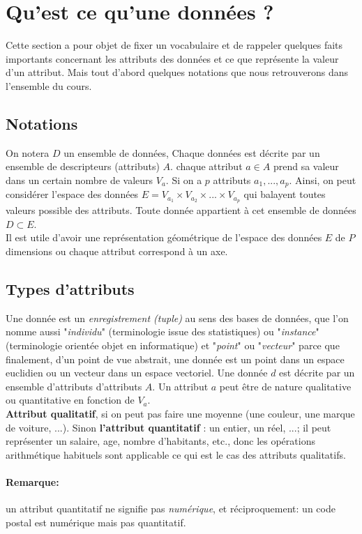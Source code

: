 \documentclass[runningheads,a4paper]{llncs}
\begin{document}
\section{Qu’est ce qu’une données ?}
Cette section a pour objet de fixer un vocabulaire et de rappeler quelques faits importants concernant les attributs des données et ce que représente la valeur d’un attribut. Mais tout d’abord quelques notations que nous retrouverons dans l’ensemble du cours. 
\subsection{Notations}
On notera $ D $ un ensemble de données, Chaque données est décrite par un ensemble de descripteurs (attributs) $ A $. chaque attribut $ a \in A $ prend sa valeur dans un certain nombre de valeurs $ V_{a} $.  Si on a $ p $ attributs $ a_{1},...,a_{p} $. Ainsi, on peut considérer l'espace des données $ E = V_{a_{1}} \times V_{a_{2}} \times ... \times V_{a_{p}}$  qui balayent toutes valeurs possible des attributs. Toute donnée appartient à cet ensemble de données $ D \subset E $. \\
Il est utile d'avoir une représentation géométrique de l'espace des données $ E $  de $ P $ dimensions ou chaque attribut correspond à un axe. 
\subsection{Types d'attributs}
Une donnée est un \emph{enregistrement (tuple)} au sens des bases de données, que l’on nomme aussi "\emph{individu}" (terminologie issue des statistiques) ou "\emph{instance}" (terminologie orientée objet en informatique) et "\emph{point}" ou "\emph{vecteur}" parce que finalement, d’un point de vue abstrait, une donnée est un point dans un espace euclidien ou un vecteur dans un espace vectoriel. Une donnée $ d $ est décrite par un ensemble d'attributs d’attributs $ A $. Un attribut $ a $ peut être de nature qualitative ou quantitative en fonction de $ V_{a} $.\\
\textbf{Attribut qualitatif}, si on peut pas faire une moyenne (une couleur, une marque de voiture, ...). Sinon \textbf{l'attribut quantitatif} : un entier, un réel, ...; il peut représenter un salaire, age, nombre d'habitants, etc., donc les opérations arithmétique habituels sont applicable ce qui est le cas des attributs qualitatifs.
\paragraph{\textbf{Remarque:}} un attribut quantitatif ne signifie pas \emph{numérique}, et réciproquement: un code postal est numérique mais pas quantitatif. 	
\end{document}
